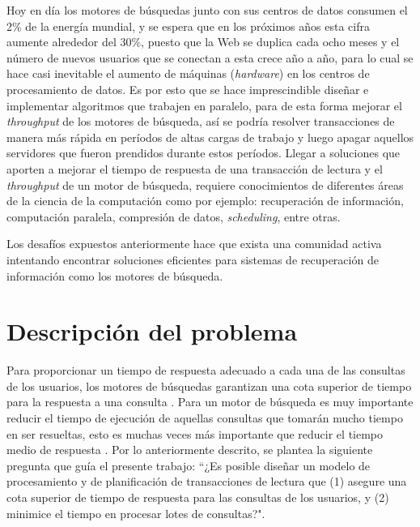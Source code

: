 Hoy en día los motores de búsquedas junto con sus centros de datos consumen el 2\% de la energía mundial, y se espera que en los próximos años esta cifra aumente alrededor del 30\%, puesto que la Web se duplica cada ocho meses y el número de nuevos usuarios que se conectan a esta crece año a año, para lo cual se hace casi inevitable el aumento de máquinas (\textit{hardware}) en los centros de procesamiento de datos. Es por esto que se hace imprescindible diseñar e implementar algoritmos que trabajen en paralelo, para de esta forma mejorar el \textit{throughput} de los motores de búsqueda, así se podría resolver transacciones de manera más rápida en períodos de altas cargas de trabajo y luego apagar aquellos servidores que fueron prendidos durante estos períodos. Llegar a soluciones que aporten a mejorar el tiempo de respuesta de una transacción de lectura y el \textit{throughput} de un motor de búsqueda, requiere conocimientos de diferentes áreas de la ciencia de la computación como por ejemplo: recuperación de información, computación paralela, compresión de datos, \textit{scheduling}, entre otras. 

Los desafíos expuestos anteriormente hace que exista una comunidad activa intentando encontrar soluciones eficientes para sistemas de recuperación de información como los motores de búsqueda.  

\section{Descripci\'on del problema}
\label{intro:problema}
Para proporcionar un tiempo de respuesta adecuado a cada una de las consultas de los usuarios, los motores de búsquedas garantizan una cota superior de tiempo para la respuesta a una consulta \citep{Jeon:2014}. Para un motor de búsqueda es muy importante reducir el tiempo de ejecución de aquellas consultas que tomarán mucho tiempo en ser resueltas, esto es muchas veces más importante que reducir el tiempo medio de respuesta \citep{Dean:2013}. Por lo anteriormente descrito, se plantea la siguiente pregunta que guía el presente trabajo: ``¿Es posible diseñar un modelo de procesamiento y de planificación de transacciones de lectura que (1) asegure una cota superior de tiempo de respuesta para las consultas de los usuarios, y (2) minimice el tiempo en procesar lotes de consultas?".  

